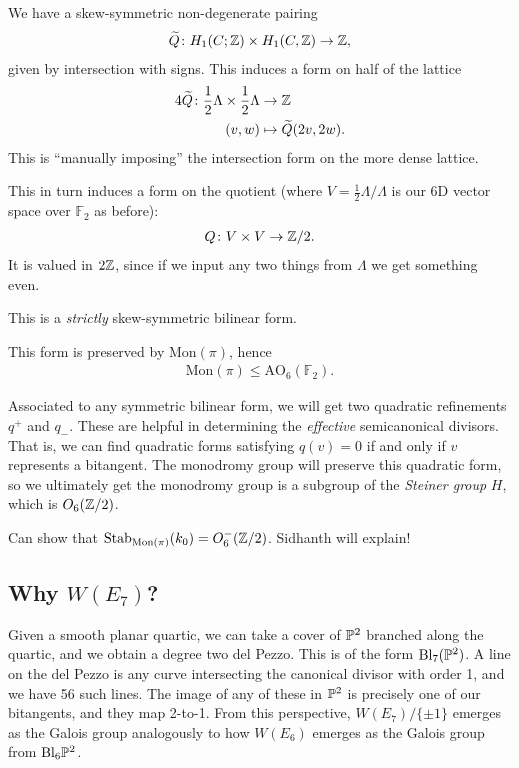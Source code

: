 \documentclass[11pt]{amsart}
\let\til\widetilde
\providecommand{\Mon}{\mathrm{Mon}}
\begin{document}
We have a skew-symmetric non-degenerate pairing
\begin{align*}
    \til{Q} \colon H_1(C;\Z) \times H_1(C,\Z) \to \Z,
\end{align*}
given by intersection with signs. This induces a form on half of the lattice
\begin{align*}
    4 \til{Q} \colon \frac{1}{2}\Lambda \times \frac{1}{2} \Lambda &\to \Z \\
    (v,w) &\mapsto \til{Q}(2v,2w).
\end{align*}
This is ``manually imposing'' the intersection form on the more dense lattice.

This in turn induces a form on the quotient (where $V = \frac{1}{2}\Lambda / \Lambda$ is our 6D vector space over $\mathbb{F}_2$ as before):
\begin{align*}
    Q \colon V \times V \to \Z/2.
\end{align*}
It is valued in $2\Z$, since if we input any two things from $\Lambda$ we get something even.

This is a \textit{strictly} skew-symmetric bilinear form.

This form is preserved by $\Mon(\pi)$, hence
\begin{align*}
    \Mon(\pi) \le \text{AO}_6(\mathbb{F}_2).
\end{align*}
%

Associated to any symmetric bilinear form, we will get two quadratic refinements $q^+$ and $q_-$. These are helpful in determining the \textit{effective} semicanonical divisors. That is, we can find quadratic forms satisfying $q(v) = 0$ if and only if $v$ represents a bitangent. The monodromy group will preserve this quadratic form, so we ultimately get the monodromy group is a subgroup of the \textit{Steiner group} $H$, which is $O_6(\Z/2)$.

Can show that $\Stab_{\Mon(\pi)}(k_0) = O_6^{-}(\Z/2)$. Sidhanth will explain!



\subsection{Why \texorpdfstring{$W(E_7)$}{W(E7)}?}

Given a smooth planar quartic, we can take a cover of $\P^2$ branched along the quartic, and we obtain a degree two del Pezzo. This is of the form $\Bl_7(\P^2)$. A line on the del Pezzo is any curve intersecting the canonical divisor with order 1, and we have 56 such lines. The image of any of these in $\P^2$ is precisely one of our bitangents, and they map 2-to-1. From this perspective, $W(E_7)/\{\pm 1\}$ emerges as the Galois group analogously to how $W(E_6)$ emerges as the Galois group from $\Bl_6 \P^2$.
\end{document}
